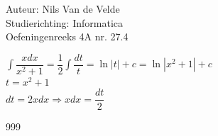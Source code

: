 \documentclass[a4paper]{article}
\begin{document}
  
\noindent \large Auteur: Nils Van de Velde \\
\noindent \large Studierichting: Informatica\\
\noindent \large Oefeningenreeks 4A nr. 27.4\\

\medskip

\normalsize

$\displaystyle\int\dfrac{xdx}{x^2+1}=\dfrac{1}{2}\displaystyle\int\dfrac{dt}{t}=\ln|t|+c=\ln|x^2+1|+c$\\

$t=x^2+1$\\

$dt=2xdx\Rightarrow xdx=\dfrac{dt}{2}$\\

\begin{thebibliography}{999}
\end{thebibliography}
\end{document}
